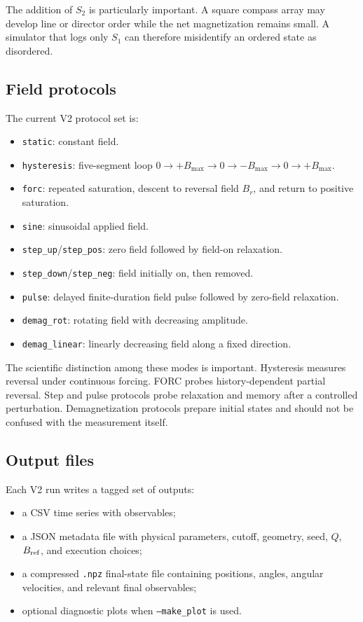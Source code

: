 \documentclass[11pt,a4paper]{article}
\newcommand{\code}[1]{\texttt{#1}}
\begin{document}
The addition of $S_2$ is particularly important. A square compass array may develop line or director order while the net magnetization remains small. A simulator that logs only $S_1$ can therefore misidentify an ordered state as disordered.

\subsection{Field protocols}

The current V2 protocol set is:
\begin{itemize}[leftmargin=*]
\item \code{static}: constant field.
\item \code{hysteresis}: five-segment loop $0\to +B_{\max}\to0\to-B_{\max}\to0\to+B_{\max}$.
\item \code{forc}: repeated saturation, descent to reversal field $B_r$, and return to positive saturation.
\item \code{sine}: sinusoidal applied field.
\item \code{step\_up}/\code{step\_pos}: zero field followed by field-on relaxation.
\item \code{step\_down}/\code{step\_neg}: field initially on, then removed.
\item \code{pulse}: delayed finite-duration field pulse followed by zero-field relaxation.
\item \code{demag\_rot}: rotating field with decreasing amplitude.
\item \code{demag\_linear}: linearly decreasing field along a fixed direction.
\end{itemize}

The scientific distinction among these modes is important. Hysteresis measures reversal under continuous forcing. FORC probes history-dependent partial reversal. Step and pulse protocols probe relaxation and memory after a controlled perturbation. Demagnetization protocols prepare initial states and should not be confused with the measurement itself.

\subsection{Output files}

Each V2 run writes a tagged set of outputs:
\begin{itemize}[leftmargin=*]
\item a CSV time series with observables;
\item a JSON metadata file with physical parameters, cutoff, geometry, seed, $Q$, $B_{\rm ref}$, and execution choices;
\item a compressed \code{.npz} final-state file containing positions, angles, angular velocities, and relevant final observables;
\item optional diagnostic plots when \code{--make\_plot} is used.
\end{itemize}
\end{document}
